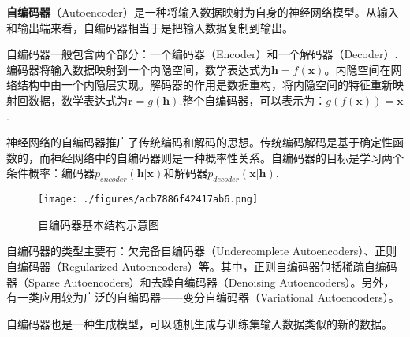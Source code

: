 
\textbf{自编码器}（Autoencoder）是一种将输入数据映射为自身的神经网络模型。从输入和输出端来看，自编码器相当于是把输入数据复制到输出。

自编码器一般包含两个部分：一个编码器（Encoder）和一个解码器（Decoder）.编码器将输入数据映射到一个内隐空间，数学表达式为$\boldsymbol{h}=f(\boldsymbol{x})$。内隐空间在网络结构中由一个内隐层实现。解码器的作用是数据重构，将内隐空间的特征重新映射回数据，数学表达式为$\boldsymbol{r}=g(\boldsymbol{h})$.整个自编码器，可以表示为：$g(f(\boldsymbol{x}))=\boldsymbol{x}$.

神经网络的自编码器推广了传统编码和解码的思想。传统编码解码是基于确定性函数的，而神经网络中的自编码器则是一种概率性关系。自编码器的目标是学习两个条件概率：编码器$p_{encoder}(\boldsymbol{h}|\boldsymbol{x})$和解码器$p_{decoder}(\boldsymbol{x}|\boldsymbol{h})$\cite{GDL}.

\begin{figure}[ht]
\centering
\texttt{[image: ./figures/acb7886f42417ab6.png]}
\caption{自编码器基本结构示意图 \cite{GDL}} \label{fig_AE_1} 
\end{figure}

自编码器的类型主要有：欠完备自编码器（Undercomplete Autoencoders）、正则自编码器（Regularized Autoencoders）等。其中，正则自编码器包括稀疏自编码器（Sparse Autoencoders）和去躁自编码器（Denoising Autoencoders）。另外，有一类应用较为广泛的自编码器——变分自编码器（Variational Autoencoders）。

自编码器也是一种生成模型，可以随机生成与训练集输入数据类似的新的数据。
